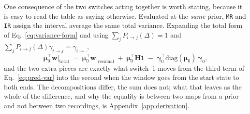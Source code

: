 \begin{appendixbox}
One consequence of the two switches acting together is worth stating, because it is easy to
read the table as saying otherwise. Evaluated at the \emph{same} prior, \texttt{MR} and
\texttt{IR} assign the interval average the same total variance. Expanding the total form of
Eq.~\ref{eq:variance-form} and using
$\sum_{j}P_{i\to j}(\Delta)=1$ and $\sum_{j}P_{i\to j}(\Delta)\bar{\gamma}_{i\to j}
=\bar{\gamma}_{i\to\cdot}$,
\begin{equation}
  \boldsymbol{\mu}_0^\top\mathbf{w}\big|_{\text{total}}
  \;=\;
  \boldsymbol{\mu}_0^\top\mathbf{w}\big|_{\text{residual}}
  \;+\; \boldsymbol{\mu}_0^\top\mathbf{H}\mathbf{1}
  \;-\; \bar{\boldsymbol{\gamma}}_0^\top\mathrm{diag}(\boldsymbol{\mu}_0)\,\bar{\boldsymbol{\gamma}}_0,
  \label{eq:mr-ir-identity}
\end{equation}
and the two extra pieces are exactly what switch~1 moves from the third term of
Eq.~\ref{eq:pred-var} into the second when the window goes from the start state to both
ends. The
decompositions differ, the sum does not; what that leaves as the whole of the difference, and why
the equality is between two maps from a prior and not between two recordings, is
Appendix~\ref{app:derivation}.


\end{appendixbox}
